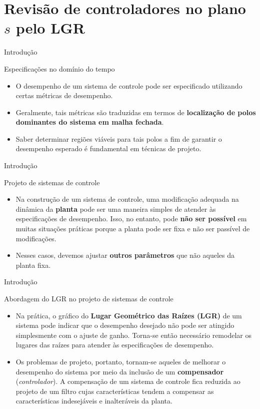 \section{Revisão de controladores no \texorpdfstring{plano $ s $}{plano-s} pelo LGR}

\begin{frame}{Introdução}
\begin{block}{Especificações no domínio do tempo}
\begin{itemize}
    \item O desempenho de um sistema de controle pode ser especificado utilizando certas métricas de desempenho.
    \item Geralmente, tais métricas são traduzidas em termos de \textbf{localização de  polos dominantes do sistema em malha fechada}. 
    \item Saber determinar regiões viáveis para tais polos a fim de garantir o desempenho esperado é fundamental em técnicas de projeto.
\end{itemize}
\end{block}
\end{frame}

\begin{frame}{Introdução}
\begin{block}{Projeto de sistemas de controle}
\begin{itemize}
    \item Na construção de um sistema de controle, uma modificação adequada na dinâmica da \textbf{planta} pode ser uma maneira simples de atender às especificações de desempenho. Isso, no entanto, pode \textbf{não ser possível} em muitas situações práticas porque a planta pode ser fixa e não ser passível de modificações.
    \item Nesses casos, devemos ajustar \textbf{outros parâmetros} que não aqueles da planta fixa.
\end{itemize}
\end{block}
\end{frame}

\begin{frame}{Introdução}
\begin{block}{Abordagem do LGR no projeto de sistemas de controle}
\begin{itemize}
    \item Na prática, o gráfico do \textbf{Lugar Geométrico das Raízes (LGR)} de um sistema pode indicar que o desempenho desejado não pode ser atingido simplesmente com o ajuste de ganho. Torna-se então necessário remodelar os lugares das raízes para atender às especificações de desempenho.
    \item Os problemas de projeto, portanto, tornam-se aqueles de melhorar o desempenho do sistema por meio da inclusão de um \textbf{compensador} (\textit{controlador}). A compensação de um sistema de controle fica reduzida ao projeto de um filtro cujas características tendem a compensar as características indesejáveis e inalteráveis da planta.
\end{itemize}
\end{block}
\end{frame}

